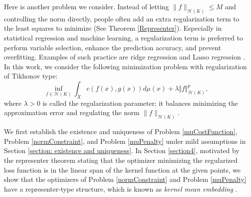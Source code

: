 \documentclass{amsart}
\numberwithin{equation}{section}
\theoremstyle{plain}
\theoremstyle{remark}
\theoremstyle{definition}
\begin{document}
Here is another problem we consider. Instead of letting $\|f\|_{\mathscr{H}(K)} \leq M$ and controlling the norm directly, people often add an extra regularization term to the least squares to minimize (See Theorem \ref{Representer}). Especially in statistical regression and machine learning, a regularization term is preferred to perform variable selection, enhance the prediction accuracy, and prevent overfitting.
Examples of such practice are ridge regression \cite{hoerl1970ridge} and Lasso regression \cite{tibshirani1996regression}.
In this work, we consider the following minimization problem with regularization of Tikhonov type:
\begin{equation}\label{muPenalty}
    \underset{f \in \mathscr{H}(K)}{\text{inf}} \ \int_{X} c(f(x),g(x))  d\mu(x)+ \lambda \Vert f \Vert_{\mathscr{H}(K)}^p,
\end{equation}
where $\lambda>0$ is called the regularization parameter; it balances minimizing the approximation error and regulating the norm $\|f\|_{\mathscr{H}(K)}$.


We first establish the existence and uniqueness of Problem \ref{muCostFunction}, Problem \ref{normConstraint}, and Problem \ref{muPenalty} under mild assumptions in Section \ref{section: existence and uniqueness}. In Section \ref{section4}, motivated by the representer theorem stating that the optimizer minimizing the regularized loss function is in the linear span of the kernel function at the given points, we show that the optimizers of Problem \ref{normConstraint} and Problem \ref{muPenalty} have a representer-type structure, which is known as \emph{kernel mean embedding} \cite{muandet2017kernel, song2008learning}. 
\end{document}

